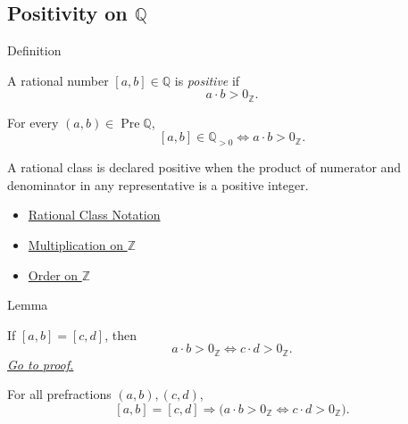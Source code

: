 \subsection*{\texorpdfstring{Positivity on $\mathbb{Q}$}{Positivity on Q}}

\begin{definitionbox}{Definition}
\begin{definition}
\label{def:positive-rational}
A rational number $[a,b]\in\mathbb{Q}$ is \emph{positive} if
\[
a\cdot b>0_{\mathbb{Z}}.
\]
\end{definition}
\end{definitionbox}

\begin{remark*}
For every $(a,b)\in\operatorname{Pre}\mathbb{Q}$,
\[
[a,b]\in\mathbb{Q}_{>0}
\Longleftrightarrow
a\cdot b>0_{\mathbb{Z}}.
\]
\end{remark*}

\begin{remark*}[Interpretation]
A rational class is declared positive when the product of numerator and
denominator in any representative is a positive integer.
\end{remark*}

\begin{dependencies}
\begin{itemize}
  \item \hyperref[def:rational-class-notation]{Rational Class Notation}
  \item \hyperref[def:multiplication-on-z-classes]{Multiplication on $\mathbb{Z}$}
  \item \hyperref[def:order-on-z]{Order on $\mathbb{Z}$}
\end{itemize}
\end{dependencies}

\begin{lemmabox}{Lemma}
\begin{lemma}
\label{lem:positivity-respects-equivalence-q}
If $[a,b]=[c,d]$, then
\[
a\cdot b>0_{\mathbb{Z}}
\Longleftrightarrow
c\cdot d>0_{\mathbb{Z}}.
\]
\hyperref[prf:positivity-respects-equivalence-q]{\textit{Go to proof.}}
\end{lemma}
\end{lemmabox}

\begin{remark*}
For all prefractions $(a,b),(c,d)$,
\[
[a,b]=[c,d]\Longrightarrow
\bigl(a\cdot b>0_{\mathbb{Z}}\Longleftrightarrow c\cdot d>0_{\mathbb{Z}}\bigr).
\]
\end{remark*}

